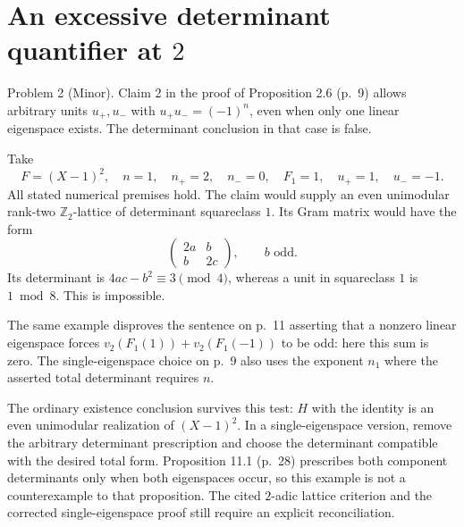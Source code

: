 \documentclass[10pt]{article}
\begin{document}
\section*{An excessive determinant quantifier at \(2\)}
Problem 2 (Minor).  Claim 2 in the proof of Proposition 2.6 (p. 9) allows arbitrary units \(u_+,u_-\) with \(u_+u_-=(-1)^n\), even when only one linear eigenspace exists. The determinant conclusion in that case is false.\par
Take \[F=(X-1)^2,\quad n=1,\quad n_+=2,\quad n_-=0,\quad
 F_1=1,\quad u_+=1,\quad u_-=-1.\] All stated numerical premises hold. The claim would supply an even unimodular rank-two \(\mathbb Z_2\)-lattice of determinant squareclass \(1\). Its Gram matrix would have the form \[\begin{pmatrix}2a&b\\b&2c\end{pmatrix},\qquad b\text{ odd}.\] Its determinant is \(4ac-b^2\equiv3\pmod4\), whereas a unit in squareclass \(1\) is \(1\bmod8\). This is impossible.\par
The same example disproves the sentence on p. 11 asserting that a nonzero linear eigenspace forces \(v_2(F_1(1))+v_2(F_1(-1))\) to be odd: here this sum is zero. The single-eigenspace choice on p. 9 also uses the exponent \(n_1\) where the asserted total determinant requires \(n\).\par
The ordinary existence conclusion survives this test: \(H\) with the identity is an even unimodular realization of \((X-1)^2\). In a single-eigenspace version, remove the arbitrary determinant prescription and choose the determinant compatible with the desired total form. Proposition 11.1 (p. 28) prescribes both component determinants only when both eigenspaces occur, so this example is not a counterexample to that proposition. The cited \(2\)-adic lattice criterion and the corrected single-eigenspace proof still require an explicit reconciliation.\par
\end{document}
